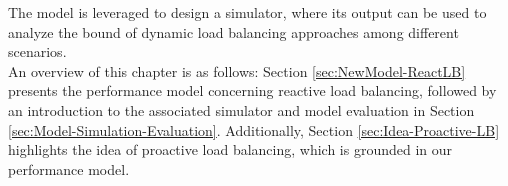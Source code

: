 The model is leveraged to design a simulator, where its output can be used to analyze the bound of dynamic load balancing approaches among different scenarios.\\

An overview of this chapter is as follows: Section \ref{sec:NewModel-ReactLB} presents the performance model concerning reactive load balancing, followed by an introduction to the associated simulator and model evaluation in Section \ref{sec:Model-Simulation-Evaluation}. Additionally, Section \ref{sec:Idea-Proactive-LB} highlights the idea of proactive load balancing, which is grounded in our performance model.







%

%


